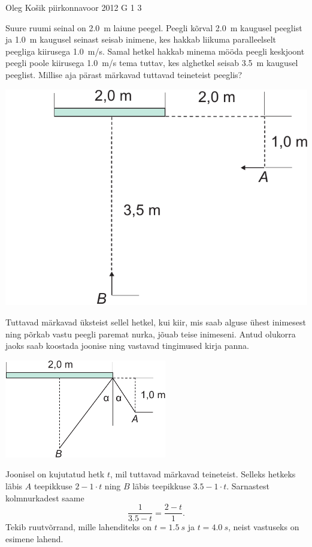 {Oleg Košik} %
{piirkonnavoor} %
{2012} %
{G 1} %
{3} %
{
\ifStatement
Suure ruumi seinal on \SI{2,0}{m} laiune peegel. Peegli kõrval \SI{2,0}{m}
kaugusel peeglist ja \SI{1,0}{m} kaugusel seinast seisab inimene, kes hakkab
liikuma paralleelselt peegliga kiirusega \SI{1,0}{m/s}. Samal hetkel hakkab
minema mööda peegli keskjoont peegli poole kiirusega \SI{1,0}{m/s} tema tuttav,
kes alghetkel seisab \SI{3,5}{m} kaugusel peeglist. Millise aja pärast
märkavad tuttavad teineteist peeglis?

\begin{center}
\includegraphics[width=0.5\linewidth]{2012-v2g-01-peegel2}%
\end{center}
\fi


\ifHint
Tuttavad märkavad üksteist sellel hetkel, kui kiir, mis saab alguse ühest inimesest ning põrkab vastu peegli paremat nurka, jõuab teise inimeseni. Antud olukorra jaoks saab koostada joonise ning vastavad tingimused kirja panna.
\fi


\ifSolution
\begin{center}
\includegraphics[width=200pt]{2012-v2g-01-peegel_lah}
\end{center}

Joonisel on kujutatud hetk $t$, mil tuttavad märkavad teineteist. Selleks hetkeks läbis $A$ teepikkuse $2-1\cdot t$ ning $B$ läbis teepikkuse $\num{3,5}-1\cdot t$. Sarnastest kolmnurkadest saame
\[
\frac{1}{\num{3,5}-t}=\frac{2-t}{1}.
\]
Tekib ruutvõrrand, mille lahenditeks on $t=\SI{1,5}{s}$ ja $t=\SI{4,0}{s}$, neist vastuseks on esimene lahend.
\fi


}
